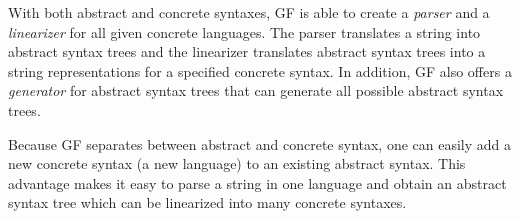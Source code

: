 With both abstract and concrete syntaxes, GF is able to create a \emph{parser} and a \emph{linearizer} for all given concrete languages. The parser translates a string into abstract syntax trees and the linearizer translates abstract syntax trees into a string representations for a specified concrete syntax. In addition, GF also offers a \emph{generator} for abstract syntax trees that can generate all possible abstract syntax trees.

Because GF separates between abstract and concrete syntax, one can easily add a new concrete syntax (a new language) to an existing abstract syntax. This advantage makes it easy to parse a string in one language and obtain an abstract syntax tree which can be linearized into many concrete syntaxes.